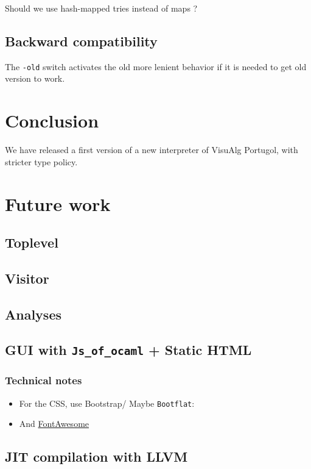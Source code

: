 \documentclass[11pt]{article}
\begin{document}
Should we use hash-mapped tries instead of maps ?

\subsection{Backward compatibility}
\label{sec-5-5}

The \texttt{-old} switch activates the old more lenient behavior if it is needed to
get old version to work.



\section{Conclusion}
\label{sec-6}

We have released a first version of a new interpreter of VisuAlg Portugol,
with stricter type policy.



\section{Future work}
\label{sec-7}

\subsection{Toplevel}
\label{sec-7-1}
\subsection{Visitor}
\label{sec-7-2}
\subsection{Analyses}
\label{sec-7-3}

\subsection{GUI with \texttt{Js\_of\_ocaml} + Static HTML}
\label{sec-7-4}

\subsubsection{Technical notes}
\label{sec-7-4-1}
\begin{itemize}
\item For the CSS, use Bootstrap/ Maybe \texttt{Bootflat}:

\item And \href{http://fortawesome.github.io/Font-Awesome/}{FontAwesome}
\end{itemize}


\subsection{JIT compilation with LLVM}
\label{sec-7-5}
\end{document}

